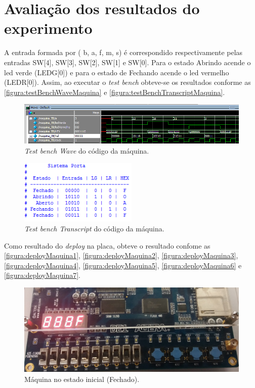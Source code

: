 \chapter{Avaliação dos resultados do experimento}
	A entrada formada por ( b, a, f, m, s) é correspondido respectivamente pelas entradas
	SW[4], SW[3], SW[2], SW[1] e SW[0]. Para o estado Abrindo acende o \ac{led} verde (LEDG[0]) e
	para o estado de Fechando acende o \ac{led} vermelho (LEDR[0]). Assim, ao executar o
	\textit{test bench} obteve-se os resultados conforme as
	\autoref{figura:testBenchWaveMaquina} e \autoref{figura:testBenchTranscriptMaquina}.

	\begin{figure}[H]
		 \centering
		 \caption{\label{figura:testBenchWaveMaquina}\textit{Test bench Wave} do código da máquina.}
		 \includegraphics[width=1\textwidth]{img/maquina/testBenchWave}
	\end{figure}

	\begin{figure}[H]
		 \centering
		 \caption{\label{figura:testBenchTranscriptMaquina}\textit{Test bench Transcript} do código da máquina.}
		 \includegraphics[width=0.5\textwidth]{img/maquina/testBenchTranscript}
	\end{figure}

	Como resultado do \textit{deploy} na placa, obteve o resultado confome as
	\autoref{figura:deployMaquina1}, \autoref{figura:deployMaquina2}, \autoref{figura:deployMaquina3},
	\autoref{figura:deployMaquina4}, \autoref{figura:deployMaquina5}, \autoref{figura:deployMaquina6} e
	\autoref{figura:deployMaquina7}.

		\begin{figure}[H]
			\includegraphics[width=1\textwidth]{img/maquina/placa/Fechado}
			\caption{Máquina no estado inicial (Fechado).\label{figura:deployMaquina1}}
		\end{figure}

